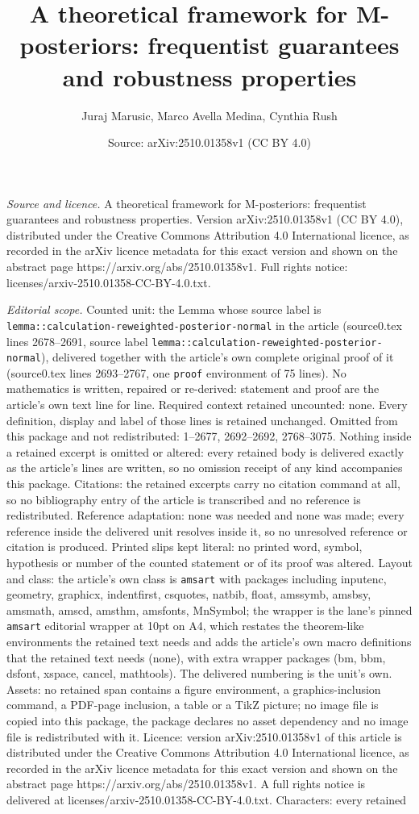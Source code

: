 \documentclass[10pt,a4paper]{amsart}
\title[A theoretical framework for M-posteriors: frequentist guaran]{A theoretical framework for M-posteriors: frequentist guarantees and robustness properties}
\author{Juraj Marusic, Marco Avella Medina, Cynthia Rush}
\date{Source: arXiv:2510.01358v1 (CC BY 4.0)}
\begin{document}
\maketitle

\noindent\emph{Source and licence.} A theoretical framework for M-posteriors: frequentist guarantees and robustness properties. Version arXiv:2510.01358v1 (CC BY 4.0), distributed under the Creative Commons Attribution 4.0 International licence, as recorded in the arXiv licence metadata for this exact version and shown on the abstract page https://arxiv.org/abs/2510.01358v1. Full rights notice: licenses/arxiv-2510.01358-CC-BY-4.0.txt.\par\smallskip

\noindent\textit{Editorial scope.} Counted unit: the Lemma whose source label is \texttt{lemma::calculation-reweighted-posterior-normal} in the article (source0.tex lines 2678--2691, source label \texttt{lemma::calculation-reweighted-posterior-normal}), delivered together with the article's own complete original proof of it (source0.tex lines 2693--2767, one \texttt{proof} environment of 75 lines). No mathematics is written, repaired or re-derived: statement and proof are the article's own text line for line. Required context retained uncounted: none. Every definition, display and label of those lines is retained unchanged. Omitted from this package and not redistributed: 1--2677, 2692--2692, 2768--3075. Nothing inside a retained excerpt is omitted or altered: every retained body is delivered exactly as the article's lines are written, so no omission receipt of any kind accompanies this package. Citations: the retained excerpts carry no citation command at all, so no bibliography entry of the article is transcribed and no reference is redistributed. Reference adaptation: none was needed and none was made; every reference inside the delivered unit resolves inside it, so no unresolved reference or citation is produced. Printed slips kept literal: no printed word, symbol, hypothesis or number of the counted statement or of its proof was altered. Layout and class: the article's own class is \texttt{amsart} with packages including inputenc, geometry, graphicx, indentfirst, csquotes, natbib, float, amssymb, amsbsy, amsmath, amscd, amsthm, amsfonts, MnSymbol; the wrapper is the lane's pinned \texttt{amsart} editorial wrapper at 10pt on A4, which restates the theorem-like environments the retained text needs and adds the article's own macro definitions that the retained text needs (none), with extra wrapper packages (bm, bbm, dsfont, xspace, cancel, mathtools). The delivered numbering is the unit's own. Assets: no retained span contains a figure environment, a graphics-inclusion command, a PDF-page inclusion, a table or a TikZ picture; no image file is copied into this package, the package declares no asset dependency and no image file is redistributed with it. Licence: version arXiv:2510.01358v1 of this article is distributed under the Creative Commons Attribution 4.0 International licence, as recorded in the arXiv licence metadata for this exact version and shown on the abstract page https://arxiv.org/abs/2510.01358v1. A full rights notice is delivered at licenses/arxiv-2510.01358-CC-BY-4.0.txt. Characters: every retained 
\end{document}
